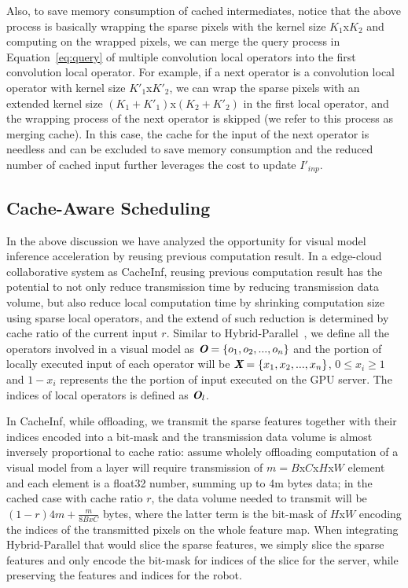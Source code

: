 Also, to save memory consumption of cached intermediates, notice that the above process is basically wrapping the sparse pixels with the kernel size $K_1$x$K_2$ and computing on the wrapped pixels, we can merge the query process in Equation~\ref{eq:query} of multiple convolution local operators into the first convolution local operator.
For example, if a next operator is a convolution local operator with kernel size $K'_1$x$K'_2$, we can wrap the sparse pixels with an extended kernel size $(K_1+K'_1)$x$(K_2+K'_2)$ in the first local operator, and the wrapping process of the next operator is skipped (we refer to this process as merging cache).
In this case, the cache for the input of the next operator is needless and can be excluded to save memory consumption and the reduced number of cached input further leverages the cost to update $I'_{inp}$.


\subsection{Cache-Aware Scheduling}
In the above discussion we have analyzed the opportunity for visual model inference acceleration by reusing previous computation result.
In a edge-cloud collaborative system as CacheInf, reusing previous computation result has the potential to not only reduce transmission time by reducing transmission data volume, but also reduce local computation time by shrinking computation size using sparse local operators, and the extend of such reduction is determined by cache ratio of the current input $r$.
Similar to Hybrid-Parallel~\cite{sun2024hybridparallel}, we define all the operators involved in a visual model as $\textit{\textbf{O}} = \{o_1, o_2,...,o_n\}$ and the portion of locally executed input of each operator will be $\textit{\textbf{X}}=\{x_1, x_2, ..., x_n\}$, $0\le x_i \ge 1$ and $1-x_i$ represents the the portion of input executed on the GPU server.
The indices of local operators is defined as $\textit{\textbf{O}}_l$.

In CacheInf, while offloading, we transmit the sparse features together with their indices encoded into a bit-mask and the transmission data volume is almost inversely proportional to cache ratio: assume wholely offloading computation of a visual model from a layer will require transmission of $m=B$x$C$x$H$x$W$ element and each element is a float32 number, summing up to 4m bytes data; in the cached case with cache ratio $r$, the data volume needed to transmit will be $(1-r)4m + \frac{m}{8BxC}$ bytes, where the latter term is the bit-mask of $H$x$W$ encoding the indices of the transmitted pixels on the whole feature map.
When integrating Hybrid-Parallel that would slice the sparse features, we simply slice the sparse features and only encode the bit-mask for indices of the slice for the server, while preserving the features and indices for the robot.

